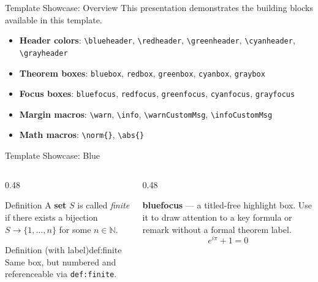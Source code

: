 

\blueheader
\begin{frame}{Template Showcase: Overview}
This presentation demonstrates the building blocks available in this template.
\medskip
\begin{itemize}
  \item \textbf{Header colors}: \texttt{\textbackslash blueheader}, \texttt{\textbackslash redheader}, \texttt{\textbackslash greenheader}, \texttt{\textbackslash cyanheader}, \texttt{\textbackslash grayheader}
  \item \textbf{Theorem boxes}: \texttt{bluebox}, \texttt{redbox}, \texttt{greenbox}, \texttt{cyanbox}, \texttt{graybox}
  \item \textbf{Focus boxes}: \texttt{bluefocus}, \texttt{redfocus}, \texttt{greenfocus}, \texttt{cyanfocus}, \texttt{grayfocus}
  \item \textbf{Margin macros}: \texttt{\textbackslash warn}, \texttt{\textbackslash info}, \texttt{\textbackslash warnCustomMsg}, \texttt{\textbackslash infoCustomMsg}
  \item \textbf{Math macros}: \texttt{\textbackslash norm\{\}}, \texttt{\textbackslash abs\{\}}
\end{itemize}
\end{frame}

\blueheader
\begin{frame}{Template Showcase: Blue}
\begin{columns}[T]
  \begin{column}{0.48\textwidth}
    \begin{bluebox*}{Definition}
      A \textbf{set} $S$ is called \emph{finite} if there exists a bijection $S \to \{1,\ldots,n\}$ for some $n \in \mathbb{N}$.
    \end{bluebox*}
    \medskip
    \begin{bluebox}{Definition (with label)}{def:finite}
      Same box, but numbered and referenceable via \texttt{def:finite}.
    \end{bluebox}
  \end{column}
  \begin{column}{0.48\textwidth}
    \begin{bluefocus}
      \textbf{bluefocus} --- a titled-free highlight box. Use it to draw attention to a key formula or remark without a formal theorem label.
      \[
        e^{i\pi} + 1 = 0
      \]
    \end{bluefocus}
  \end{column}
\end{columns}
\end{frame}

